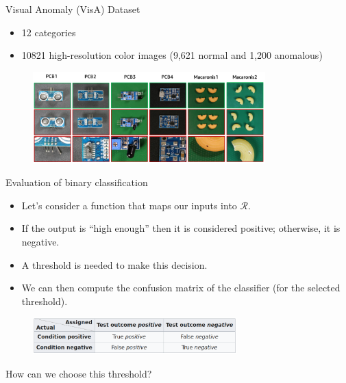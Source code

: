 \documentclass[xcolor=pdftex,dvipsnames,table,mathserif,aspectratio=169]{beamer}
\begin{document}
\begin{frame}{Visual Anomaly (VisA) Dataset~\tiny{\cite{zou_spot--difference_2022}}}

\begin{itemize}
\item 12 categories
\item 10821 high-resolution color images (9,621 normal and 1,200 anomalous)
\end{itemize}

\begin{figure}[ht]
  \centering
  \includegraphics[width=0.8\textwidth]{visa}
\end{figure}

\end{frame}


\begin{frame}{Evaluation of binary classification}

\begin{itemize}
\item Let's consider a function that maps our inputs into $\mathcal{R}$.
\item If the output is ``high enough'' then it is considered positive; otherwise, it is negative.
\item A threshold is needed to make this decision.
\item We can then compute the \alert{confusion matrix} of the classifier (for the selected threshold).
\end{itemize}

  \begin{figure}[ht]
    \centering
    \includegraphics[width=0.7\textwidth]{contingency_table}
  \end{figure}


  \begin{alertblock}{}
   How can we choose this threshold?
  \end{alertblock}

\end{frame}
\end{document}
